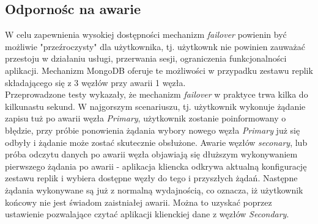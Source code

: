 \subsection{Odpornośc na awarie}
W celu zapewnienia wysokiej dostępności mechanizm \textit{failover} powienin być możliwie "przeźroczysty" dla użytkownika, tj. użytkownk nie powinien zauważać przestoju w działaniu usługi, przerwania sesji, ograniczenia funkcjonalności aplikacji. Mechanizm MongoDB oferuje te możliwości w przypadku zestawu replik składającego się z 3 węzłów przy awarii 1 węzła. \\
Przeprowadzone testy wykazały, że mechanizm \textit{failover} w praktyce trwa kilka do kilkunastu sekund. W najgorszym scenariuszu, tj. użytkownik wykonuje żądanie zapisu tuż po awarii węzła \textit{Primary}, użytkownik zostanie poinformowany o błędzie, przy próbie ponowienia żądania wybory nowego węzła \textit{Primary} już się odbyły i żądanie może zostać skutecznie obsłużone. Awarie węzłów \textit{seconary}, lub próba odczytu danych po awarii węzła objawiają się dłuższym wykonywaniem pierwszego żądania po awarii - aplikacja kliencka odkrywa aktualną konfigurację zestawu replik i wybiera dostępne węzły do tego i przyszłych żądań. Następne żądania wykonywane są już z normalną wydajnością, co oznacza, iż użytkownik końcowy nie jest świadom zaistniałej awarii. Można to uzyskać poprzez ustawienie pozwalające czytać aplikacji klienckiej dane z węzłów \textit{Secondary}.
